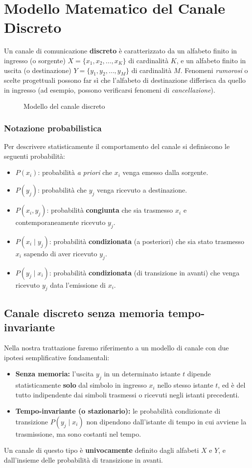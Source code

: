 \section{Modello Matematico del Canale Discreto}
Un canale di comunicazione \textbf{discreto} è caratterizzato da un alfabeto finito in ingresso (o sorgente) $X = \{x_1, x_2, \dots, x_K\}$ di cardinalità $K$, e un alfabeto finito in uscita (o destinazione) $Y = \{y_1, y_2, \dots, y_M\}$ di cardinalità $M$. Fenomeni \textit{rumorosi} o scelte progettuali possono far sì che l'alfabeto di destinazione differisca da quello in ingresso (ad esempio, possono verificarsi fenomeni di \textit{cancellazione}).

\begin{figure}[ht!] 
    \centering
    
    \caption{Modello del canale discreto}
    \label{fig:canale_discreto}
\end{figure}

\subsubsection{Notazione probabilistica}
Per descrivere statisticamente il comportamento del canale si definiscono le seguenti probabilità:
\begin{itemize}
    \item $P(x_i)$: probabilità \textit{a priori} che $x_i$ venga emesso dalla sorgente.
    \item $P(y_j)$: probabilità che $y_j$ venga ricevuto a destinazione.
    \item $P(x_i,y_j)$: probabilità \textbf{congiunta} che sia trasmesso $x_i$ e contemporaneamente ricevuto $y_j$.
    \item $P(x_i \mid y_j)$: probabilità \textbf{condizionata} (a posteriori) che sia stato trasmesso $x_i$ sapendo di aver ricevuto $y_j$.
    \item $P(y_j \mid x_i)$: probabilità \textbf{condizionata} (di transizione in avanti) che venga ricevuto $y_j$ data l'emissione di $x_i$.
\end{itemize}

\subsection{Canale discreto senza memoria tempo-invariante}
Nella nostra trattazione faremo riferimento a un modello di canale con due ipotesi semplificative fondamentali:
\begin{itemize}
    \item \textbf{Senza memoria:} l'uscita $y_j$ in un determinato istante $t$ dipende statisticamente \textbf{solo} dal simbolo in ingresso $x_i$ nello stesso istante $t$, ed è del tutto indipendente dai simboli trasmessi o ricevuti negli istanti precedenti.
    \item \textbf{Tempo-invariante (o stazionario):} le probabilità condizionate di transizione $P(y_j \mid x_i)$ non dipendono dall'istante di tempo in cui avviene la trasmissione, ma sono costanti nel tempo.
\end{itemize}
Un canale di questo tipo è \textbf{univocamente} definito dagli alfabeti $X$ e $Y$, e dall'insieme delle probabilità di transizione in avanti.

